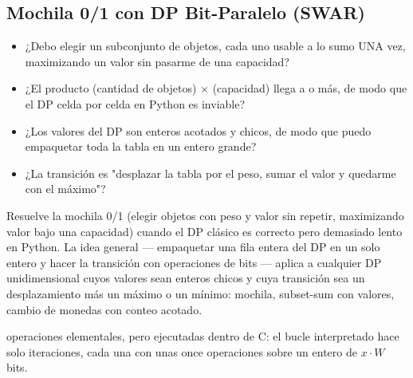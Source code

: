 \subsection{Mochila 0/1 con DP Bit-Paralelo (SWAR)}
\label{alg:6-4}


\begin{itemize}
\item ¿Debo elegir un subconjunto de objetos, cada uno usable a lo sumo UNA vez, maximizando un valor sin pasarme de una capacidad?
\item ¿El producto (cantidad de objetos) $\times$ (capacidad) llega a  o más, de modo que el DP celda por celda en Python es inviable?
\item ¿Los valores del DP son enteros acotados y chicos, de modo que puedo empaquetar toda la tabla en un entero grande?
\item ¿La transición es "desplazar la tabla por el peso, sumar el valor y quedarme con el máximo"?
\end{itemize}

 Resuelve la mochila 0/1 (elegir objetos con peso y valor sin repetir, maximizando valor bajo una capacidad) cuando el DP clásico es correcto pero demasiado lento en Python. La idea general — empaquetar una fila entera del DP en un solo entero y hacer la transición con operaciones de bits — aplica a cualquier DP unidimensional cuyos valores sean enteros chicos y cuya transición sea un desplazamiento más un máximo o un mínimo: mochila, subset-sum con valores, cambio de monedas con conteo acotado.

  operaciones elementales, pero ejecutadas dentro de C: el bucle interpretado hace solo  iteraciones, cada una con unas once operaciones sobre un entero de $x \cdot W$ bits.

